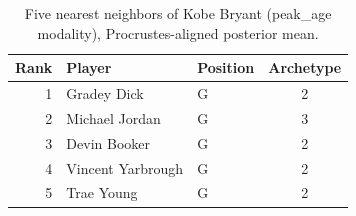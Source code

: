 \begin{table}[htbp]
  \centering\small
  \begin{tabular}{rllc}
    \toprule
    Rank & Player & Position & Archetype \\
    \midrule
    1 & Gradey Dick & G & 2 \\
    2 & Michael Jordan & G & 3 \\
    3 & Devin Booker & G & 2 \\
    4 & Vincent Yarbrough & G & 2 \\
    5 & Trae Young & G & 2 \\
    \bottomrule
  \end{tabular}
  \caption{Five nearest neighbors of Kobe Bryant (peak_age modality), Procrustes-aligned posterior mean.}
  \label{tab:Kobe_Bryant_neighbors_peak_age}
\end{table}

